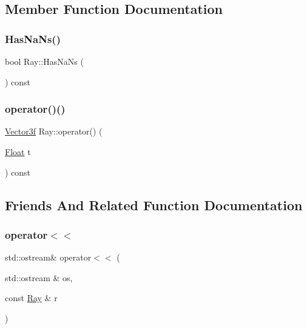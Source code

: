 \subsection{Member Function Documentation}
\mbox{\label{classRay_a231f9ccb885aed83a741f3f283f05594}} 
\subsubsection{\texorpdfstring{HasNaNs()}{HasNaNs()}}
{\footnotesize\ttfamily bool Ray\+::\+Has\+Na\+Ns (\begin{DoxyParamCaption}{ }\end{DoxyParamCaption}) const}

\mbox{\label{classRay_acf15f78bec949afa83834de9127a3fe4}} 
\subsubsection{\texorpdfstring{operator()()}{operator()()}}
{\footnotesize\ttfamily \mbox{\hyperlink{cyclop_8hpp_a5a0a2e85b081623ef3f7e7e8d43024f5}{Vector3f}} Ray\+::operator() (\begin{DoxyParamCaption}\item[{\mbox{\hyperlink{cyclop_8hpp_a07afd7094cb489cbd514c76e6f55d34f}{Float}}}]{t }\end{DoxyParamCaption}) const}



\subsection{Friends And Related Function Documentation}
\mbox{\label{classRay_ab3d8282886cc0ee5f020164865c0ca50}} 
\subsubsection{\texorpdfstring{operator$<$$<$}{operator<<}}
{\footnotesize\ttfamily std\+::ostream\& operator$<$$<$ (\begin{DoxyParamCaption}\item[{std\+::ostream \&}]{os,  }\item[{const \mbox{\hyperlink{classRay}{Ray}} \&}]{r }\end{DoxyParamCaption})\hspace{0.3cm}{\ttfamily [friend]}}



